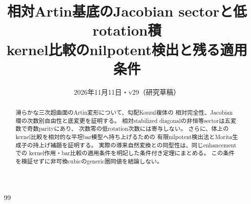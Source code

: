 
\title{相対Artin基底のJacobian sectorと低rotation積\\\large kernel比較のnilpotent検出と残る適用条件}
\author{}
\date{2026年11月11日・v29（研究草稿）}

\maketitle
\begin{abstract}
滑らかな三次超曲面のArtin変形について、勾配Koszul複体の
相対完全性、Jacobian環の次数別自由性と底変更を証明する。
相対stabilized diagonalの非恒等sectorは五変数で奇数parityにあり、
次数零の低rotation次数には寄与しない。
さらに、体上のkernel比較を相対的な平坦bar模型へ持ち上げるための
有限nilpotent検出法とMorita生成子の持上げ補題を証明する。
実際の導来自然変換との同型性は、同じenhancementでの
kernel作用・bar比較の適用条件を明記した条件付き定理にまとめる。
この条件を検証せずに非可換cubicのgeneric圏同値を結論しない。
\end{abstract}
\tableofcontents

\begin{thebibliography}{99}

\end{thebibliography}

